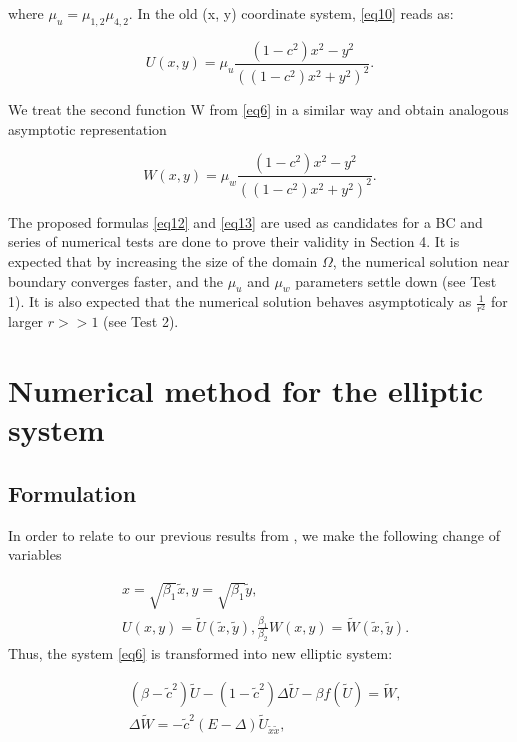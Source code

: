 \documentclass[12pt]{article}
\theoremstyle{theorem}
\theoremstyle{defi}
\begin{document}
where $\mu_u = \mu_{1,2} \mu_{4,2}$. In the old (x, y) coordinate system, \eqref{eq10}  reads as:

\begin{equation}
U(x,y) = \mu_u \frac{(1-c^2)x^2 - y^2}{ ( (1-c^2)x^2 + y^2 )^2 }. \label{eq12}
\end{equation}

We treat the second function W from \eqref{eq6}  in a similar way and obtain analogous asymptotic representation

\begin{equation}
W(x,y) = \mu_w \frac{(1-c^2)x^2 - y^2}{ ( (1-c^2)x^2 + y^2 )^2 }. \label{eq13}
\end{equation}

The proposed formulas \eqref{eq12} and \eqref{eq13} are used as candidates for a BC and series of numerical tests are done to prove their validity in Section 4. 
It is expected that by increasing the size of the domain $\Omega$, the numerical solution near boundary converges faster, and the $\mu_u$ and $\mu_w$ parameters settle down (see Test 1). It is also expected that the numerical solution behaves asymptoticaly as $\frac{1}{r^2}$ for larger $r >> 1$ (see Test 2).

\section{Numerical method for the elliptic system}

\subsection{Formulation}


In order to relate to our previous results from \cite{ref14, ref15}, we make the following change of variables

\begin{equation}\label{eqVCN}
\begin{split}
&x=\sqrt{\beta_1} { \tilde{x} }, y=\sqrt{\beta_1} { \tilde{ y} },\\
&U(x,y)= \tilde U({ \tilde{x} },{ \tilde{y} } ), \frac{\beta_1}{\beta_2} W(x,y)=  \tilde W({ \tilde{x} },{ \tilde{y} } ).
\end{split}
\end{equation}
Thus, the system \eqref{eq6} is transformed into new elliptic system:

\begin{equation}\label{eq31}
\begin{split}
&(\beta-\tilde c ^2) \tilde U  -(1- \tilde c^2) \Delta \tilde U - \beta f( \tilde U ) = \tilde W, \\
&\Delta \tilde W =  - \tilde c^2 (E- \Delta) \tilde U_{\tilde x \tilde x},
\end{split}
\end{equation}
\end{document}
